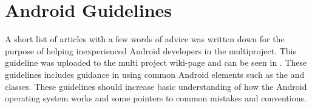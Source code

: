 
\section{Android Guidelines}
A short list of articles with a few words of advice was written down for the purpose of helping inexperienced Android developers in the multiproject. This guideline was uploaded to the multi project wiki-page and can be seen in . These guidelines includes guidance in using common Android elements such as the  and  classes. These guidelines should increase basic understanding of how the Android operating system works and some pointers to common mistakes and conventions.
